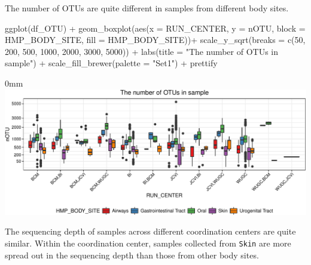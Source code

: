 \documentclass[]{article}
\newcommand{\hlnum}[1]{\textcolor[rgb]{0.816,0.125,0.439}{#1}}%
\newcommand{\hlstr}[1]{\textcolor[rgb]{0.251,0.627,0.251}{#1}}%
\newcommand{\hlopt}[1]{\textcolor[rgb]{0,0,0}{#1}}%
\newcommand{\hlstd}[1]{\textcolor[rgb]{0.251,0.251,0.251}{#1}}%
\newcommand{\hlkwc}[1]{\textcolor[rgb]{0.251,0.251,0.251}{#1}}%
\newcommand{\hlkwd}[1]{\textcolor[rgb]{0.878,0.439,0.125}{#1}}%
\newenvironment{Shaded}{\begin{myshaded}}{\end{myshaded}}
\newcommand{\KeywordTok}[1]{\hlkwd{#1}}
\newcommand{\DataTypeTok}[1]{\hlkwc{#1}}
\newcommand{\DecValTok}[1]{\hlnum{#1}}
\newcommand{\StringTok}[1]{\hlstr{#1}}
\newcommand{\OperatorTok}[1]{\hlopt{#1}}
\newcommand{\NormalTok}[1]{\hlstd{#1}}
\begin{document}
The number of OTUs are quite different in samples from different body sites.

\begin{Shaded}
\begin{Highlighting}[]
\KeywordTok{ggplot}\NormalTok{(df_OTU) }\OperatorTok{+}
\StringTok{  }\KeywordTok{geom_boxplot}\NormalTok{(}\KeywordTok{aes}\NormalTok{(}\DataTypeTok{x =}\NormalTok{ RUN_CENTER, }\DataTypeTok{y =}\NormalTok{ nOTU,}
                   \DataTypeTok{block =}\NormalTok{ HMP_BODY_SITE, }\DataTypeTok{fill =}\NormalTok{ HMP_BODY_SITE))}\OperatorTok{+}\StringTok{ }
\StringTok{  }\KeywordTok{scale_y_sqrt}\NormalTok{(}\DataTypeTok{breaks =} \KeywordTok{c}\NormalTok{(}\DecValTok{50}\NormalTok{, }\DecValTok{200}\NormalTok{, }\DecValTok{500}\NormalTok{, }\DecValTok{1000}\NormalTok{, }\DecValTok{2000}\NormalTok{, }\DecValTok{3000}\NormalTok{, }\DecValTok{5000}\NormalTok{)) }\OperatorTok{+}
\StringTok{  }\KeywordTok{labs}\NormalTok{(}\DataTypeTok{title =} \StringTok{"The number of OTUs in sample"}\NormalTok{) }\OperatorTok{+}
\StringTok{  }\KeywordTok{scale_fill_brewer}\NormalTok{(}\DataTypeTok{palette =} \StringTok{"Set1"}\NormalTok{) }\OperatorTok{+}
\StringTok{  }\NormalTok{prettify }
\end{Highlighting}
\end{Shaded}

\begin{adjustwidth}{\fltoffset}{0mm}
\includegraphics{figure/unnamed-chunk-50-1} \end{adjustwidth}

The sequencing depth of samples across different coordination centers are quite
similar. Within the coordination center, samples collected from \texttt{Skin} are more spread out in the sequencing depth than those from other body sites.
\end{document}

